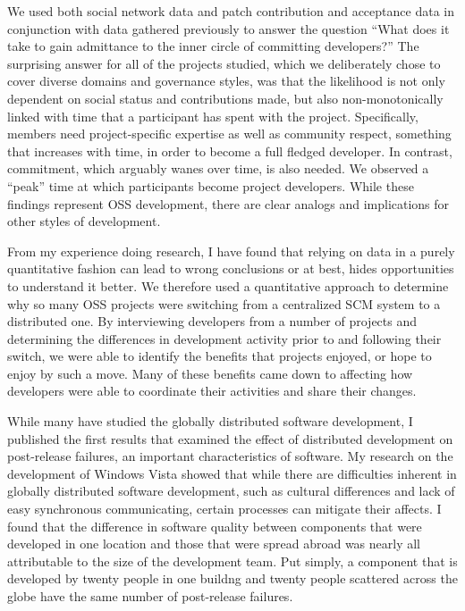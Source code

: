 \documentclass[10pt]{article}
\begin{document}
\begin{small}
We used both social network data and patch contribution and acceptance data in
conjunction with data gathered previously to answer the question ``What does it
take to gain admittance to the inner circle of committing developers?'' The
surprising answer for all of the projects studied, which we deliberately chose
to cover diverse domains and governance styles, was that the likelihood is not
only dependent on social status and contributions made, but also
non-monotonically linked with time that a participant has spent with the
project.  Specifically, members need project-specific expertise as well as
community respect, something that increases with time, in order to become a
full fledged developer.  In contrast, commitment, which arguably wanes over
time, is also needed.  We observed a ``peak'' time at which participants become
project developers.  While these findings represent OSS development, there are
clear analogs and implications for other styles of development.

From my experience doing research, I have found that relying on data in a
purely quantitative fashion can lead to wrong conclusions or at best, hides
opportunities to understand it better.  We therefore used a quantitative
approach to determine why so many OSS projects were switching from a
centralized SCM system to a distributed one.  By interviewing developers from a
number of projects and determining the differences in development activity
prior to and following their switch, we were able to identify the benefits that
projects enjoyed, or hope to enjoy by such a move.  Many of these benefits came
down to affecting how developers were able to coordinate their activities and
share their changes.

While many have studied the globally distributed software development, I
published the first results that examined the effect of distributed development
on post-release failures, an important characteristics of
software.  My research on the development of Windows Vista showed that while
there are difficulties inherent in globally distributed software development,
such as cultural differences and lack of easy synchronous communicating, 
certain processes can mitigate their affects.  I found that
the difference in software quality between components that were developed in one
location and those that were spread abroad was nearly all attributable to the
size of the development team.  Put simply, a component that is developed by twenty
people in one buildng and twenty people scattered across the globe have the
same number of post-release failures.


\end{small}
\end{document}
